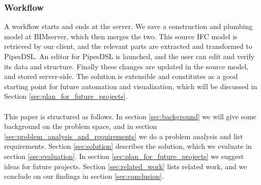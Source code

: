 \subsubsection{Workflow}
\label{sec:workflow}
A workflow starts and ends at the server. We save a construction and plumbing model at BIMserver, which then merges the two. This source IFC model is retrieved by our client, and the relevant parts are extracted and transformed to PipesDSL. An editor for PipesDSL is launched, and the user can edit and verify its data and structure. Finally these changes are updated in the source model, and stored server-side. The solution is extensible and constitutes as a good starting point for future automation and visualization, which will be discussed in Section \ref{sec:plan_for_future_projects}.

\paragraph{}
This paper is structured as follows. In section \ref{sec:background} we will give some background on the problem space, and in section \ref{sec:problem_analysis_and_requirements} we do a problem analysis and list requirements. Section \ref{sec:solution} describes the solution, which we evaluate in section \ref{sec:evaluation}. In section \ref{sec:plan_for_future_projects} we suggest ideas for future projects. Section \ref{sec:related_work} lists related work, and we conclude on our findings in section \ref{sec:conclusion}.
